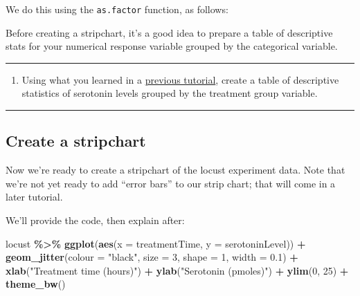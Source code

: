 \documentclass[
]{book}
\newenvironment{Shaded}{\begin{snugshade}}{\end{snugshade}}
\newcommand{\AttributeTok}[1]{\textcolor[rgb]{0.13,0.29,0.53}{#1}}
\newcommand{\DecValTok}[1]{\textcolor[rgb]{0.00,0.00,0.81}{#1}}
\newcommand{\FloatTok}[1]{\textcolor[rgb]{0.00,0.00,0.81}{#1}}
\newcommand{\FunctionTok}[1]{\textcolor[rgb]{0.13,0.29,0.53}{\textbf{#1}}}
\newcommand{\NormalTok}[1]{#1}
\newcommand{\OtherTok}[1]{\textcolor[rgb]{0.56,0.35,0.01}{#1}}
\newcommand{\SpecialCharTok}[1]{\textcolor[rgb]{0.81,0.36,0.00}{\textbf{#1}}}
\newcommand{\StringTok}[1]{\textcolor[rgb]{0.31,0.60,0.02}{#1}}
\providecommand{\tightlist}{%
  \setlength{\itemsep}{0pt}\setlength{\parskip}{0pt}}
\begin{document}
We do this using the \texttt{as.factor} function, as follows:

\begin{Shaded}
\end{Shaded}

Before creating a stripchart, it's a good idea to prepare a table of descriptive stats for your numerical response variable grouped by the categorical variable.

\begin{center}\rule{0.5\linewidth}{0.5pt}\end{center}

\begin{enumerate}
\def\labelenumi{\arabic{enumi}.}
\tightlist
\item
  Using what you learned in a \hyperref[desc_numeric_var_cat]{previous tutorial}, create a table of descriptive statistics of serotonin levels grouped by the treatment group variable.
\end{enumerate}

\begin{center}\rule{0.5\linewidth}{0.5pt}\end{center}

\subsection{Create a stripchart}\label{stripchart}

Now we're ready to create a stripchart of the locust experiment data. Note that we're not yet ready to add ``error bars'' to our strip chart; that will come in a later tutorial.

We'll provide the code, then explain after:

\begin{Shaded}
\begin{Highlighting}[]
\NormalTok{locust }\SpecialCharTok{\%\textgreater{}\%} 
  \FunctionTok{ggplot}\NormalTok{(}\FunctionTok{aes}\NormalTok{(}\AttributeTok{x =}\NormalTok{ treatmentTime, }\AttributeTok{y =}\NormalTok{ serotoninLevel)) }\SpecialCharTok{+}
  \FunctionTok{geom\_jitter}\NormalTok{(}\AttributeTok{colour =} \StringTok{"black"}\NormalTok{, }\AttributeTok{size =} \DecValTok{3}\NormalTok{, }\AttributeTok{shape =} \DecValTok{1}\NormalTok{, }\AttributeTok{width =} \FloatTok{0.1}\NormalTok{) }\SpecialCharTok{+}
  \FunctionTok{xlab}\NormalTok{(}\StringTok{"Treatment time (hours)"}\NormalTok{) }\SpecialCharTok{+}
  \FunctionTok{ylab}\NormalTok{(}\StringTok{"Serotonin (pmoles)"}\NormalTok{) }\SpecialCharTok{+}
  \FunctionTok{ylim}\NormalTok{(}\DecValTok{0}\NormalTok{, }\DecValTok{25}\NormalTok{) }\SpecialCharTok{+}
  \FunctionTok{theme\_bw}\NormalTok{()}
\end{Highlighting}
\end{Shaded}
\end{document}
